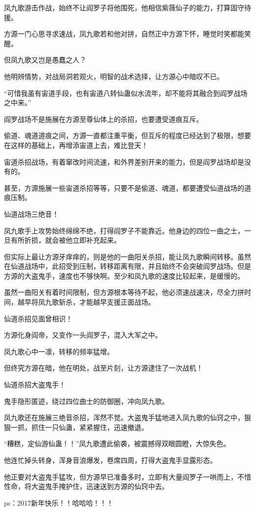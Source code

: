 \begin{this_body}
凤九歌游击作战，始终不让阎罗子将他围死，他相信紫薇仙子的能力，打算固守待援。

方源一门心思寻求速战，凤九歌若和他对拼，自然正中方源下怀，睡觉时笑都能笑醒。

但凤九歌又岂是愚蠢之人？

他明辨情势，对战局洞若观火，明智的战术选择，让方源心中暗叹不已。

“可惜我虽有宙道手段，也有宙道八转仙蛊似水流年，却不能将其融合到阎罗战场之中来。”

阎罗战场不是施展在方源至尊仙体上的杀招，也要遭受道痕互斥。

偷道、魂道道痕之间，方源一直都注重平衡，但互斥的程度已经达到了极限，想要在这样的基础上，再增添宙道上去，难比登天！

宙道杀招战场，有着窜改时间流速，和外界差别开来的能力，但是阎罗战场却是没有的。

甚至，方源施展一些宙道杀招等等，只要不是偷道、魂道，都要遭受仙道战场的道痕压制。

仙道战场三绝音！

凤九歌手上攻势始终绵绵不绝，打得阎罗子不能靠近。他身边的四位一曲之士，一旦有所折损，就会被他立即补充起来。

但实际上最让方源牙痒痒的，则是他的一曲阳关杀招，能让凤九歌瞬间转移。虽然在仙道战场中，此招受到压制，转移距离有限，并且始终不会突破阎罗战场。但是方源的大盗鬼手，速度也不够快啊。至少和凤九歌的速度比较起来，是缓慢的。

虽然一曲阳关有着时间限制，但方源根本等待不起，他必须速战速决，尽全力拼时间，越早将凤九歌斩杀，才能越早支援正面战场。

仙道杀招见面曾相识！

方源化身阎帝，又变作一头阎罗子，混入大军之中。

凤九歌心中一凛，转移的频率猛增。

但终究方源在暗，他在明处，战至片刻，让方源逮住了一次战机！

仙道杀招大盗鬼手！

鬼手隐形匿迹，绕过四位曲士的防御圈，冲向凤九歌。

凤九歌还在施展三绝音杀招，浑然不觉。大盗鬼手猛地进入凤九歌的仙窍之中，狠狠一抓，抓住一只仙蛊，紧紧握住，迅速撤退。

“糟糕，定仙游仙蛊！！”凤九歌遭此偷袭，被震撼得双眼圆瞪，大惊失色。

他连忙掉头转身，浑身音浪爆发，卷席四周，打得大盗鬼手显露形态。

他正要对大盗鬼手猛攻，但方源早已准备多时，立即有大量阎罗子一哄而上，不惜性命，将大盗鬼手掩护住，迅速送到方源的仙窍中去。

ps：2017新年快乐！！哈哈哈！！！

\end{this_body}

